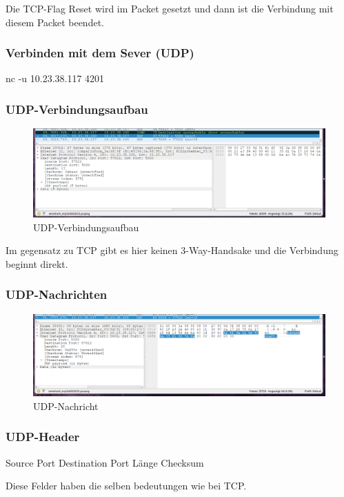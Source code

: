 \documentclass[a4paper]{article}
\begin{document}
Die TCP-Flag Reset wird im Packet gesetzt und dann ist die Verbindung mit diesem Packet beendet.
\newpage
\subsubsection{Verbinden mit dem Sever (UDP)}
nc -u 10.23.38.117 4201
\subsubsection{UDP-Verbindungsaufbau}
\begin{figure}[h]
	\includegraphics[scale=0.3]{images/udpverbindungsaufbau.png}
	\caption{UDP-Verbindungsaufbau}
\end{figure}

Im gegensatz zu TCP gibt es hier keinen 3-Way-Handsake und die Verbindung beginnt direkt.
\subsubsection{UDP-Nachrichten}
\begin{figure}[h]
	\includegraphics[scale=0.3]{images/udp-nachricht.png}
	\caption{UDP-Nachricht}
\end{figure}
\subsubsection {UDP-Header}
\begin{outline}
\1 Source Port
\1 Destination Port
\1 Länge
\1 Checksum
\end{outline}
Diese Felder haben die selben bedeutungen wie bei TCP.
\end{document}
